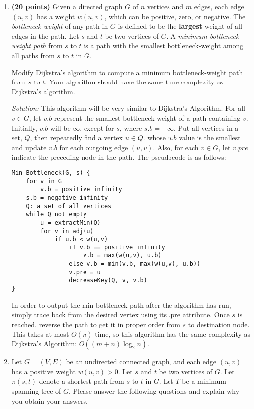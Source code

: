\documentclass[11pt]{article}
\begin{document}
\begin{enumerate}

\item
{\bf (20 points)}
Given a directed graph $G$ of $n$ vertices and $m$ edges, each edge $(u,v)$ has a weight $w(u,v)$, which can be positive, zero, or negative.
The {\em bottleneck-weight} of any path in $G$ is defined to be the
{\bf largest} weight of all edges in the path. Let $s$ and $t$ be two vertices of $G$. A {\em minimum bottleneck-weight path} from $s$ to $t$ is a path with the smallest bottleneck-weight among all paths from $s$ to $t$ in $G$.

Modify Dijkstra's algorithm to compute a  minimum bottleneck-weight path from $s$ to $t$. Your algorithm should have the same time complexity as Dijkstra's algorithm.

\textit{Solution:} This algorithm will be very similar to Dijkstra's Algorithm. For all $v \in G$, let $v.b$ represent the smallest bottleneck weight of a path containing $v$. Initially, $v.b$ will be $\infty$, except for $s$, where $s.b = -\infty$. Put all vertices in a set, $Q$, then repeatedly find a vertex $u \in Q$. whose $u.b$ value is the smallest and update $v.b$ for each outgoing edge 
$(u, v)$. Also, for each $v \in G$, let $v.pre$ indicate the preceding node in the path. The pseudocode is as follows:
\begin{verbatim}
Min-Bottleneck(G, s) {
    for v in G
        v.b = positive infinity
    s.b = negative infinity
    Q: a set of all vertices
    while Q not empty
        u = extractMin(Q)
        for v in adj(u)
            if u.b < w(u,v)
                if v.b == positive infinity
                    v.b = max(w(u,v), u.b)
                else v.b = min(v.b, max(w(u,v), u.b))
                v.pre = u
                decreaseKey(Q, v, v.b)
}
\end{verbatim}
In order to output the min-bottleneck path after the algorithm has run, simply trace back from the desired vertex using its .pre attribute. Once $s$ is reached, reverse the path to get it in proper order from $s$ to destination node. This takes at most $O(n)$ time, so this algorithm has the same complexity as Dijkstra's Algorithm: $O((m+n)\log_2n)$.

\item
Let $G=(V,E)$ be an undirected connected graph, and each edge $(u,v)$ has a positive weight $w(u,v)>0$. Let $s$ and $t$ be two vertices of $G$. Let $\pi(s,t)$ denote a shortest path from $s$ to $t$ in $G$. Let $T$ be a minimum spanning tree of $G$. Please answer the following questions and explain why you obtain your answers.


\end{enumerate}
\end{document}

